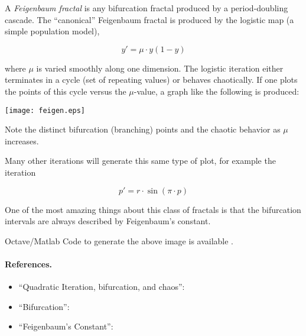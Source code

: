 \documentclass[12pt]{article}
\begin{document}
A \emph{Feigenbaum fractal} is any bifurcation fractal produced by a period-doubling cascade.  The ``canonical'' Feigenbaum fractal is produced by the logistic map (a simple population model), 

$$ y' = \mu \cdot y  (1 - y) $$

where $\mu$ is varied smoothly along one dimension.  The logistic iteration either terminates in a cycle (set of repeating values) or behaves chaotically.  If one plots the points of this cycle versus the $\mu$-value, a graph like the following is produced:

\begin{center}
\texttt{[image: feigen.eps]}
\end{center}

Note the distinct bifurcation (branching) points and the chaotic behavior as $\mu$ increases.

Many other iterations will generate this same type of plot, for example the iteration 

$$ p' = r \cdot \sin(\pi\cdot p) $$

One of the most amazing things about this class of fractals is that the bifurcation intervals are always described by Feigenbaum's constant.

Octave/Matlab Code to generate the above image is available .

\paragraph{References.}

\begin{itemize}
\item ``Quadratic Iteration, bifurcation, and chaos'': 
\item ``Bifurcation'': 
\item ``Feigenbaum's Constant'': 
\end{itemize}
\end{document}
